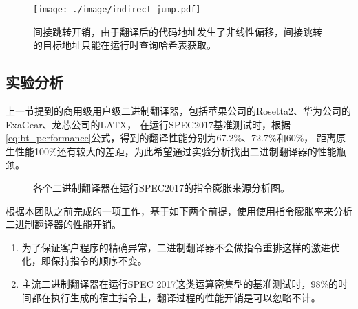 \begin{figure}[!htbp]
  \centering
  \texttt{[image: ./image/indirect\_jump.pdf]}
  \caption{间接跳转开销，由于翻译后的代码地址发生了非线性偏移，间接跳转的目标地址只能在运行时查询哈希表获取。}
  \label{img:indirect_jump}
\end{figure}

\subsection{实验分析}

上一节提到的商用级用户级二进制翻译器，包括苹果公司的Rosetta2、华为公司的ExaGear、龙芯公司的LATX，
在运行SPEC2017基准测试时，根据\ref{eq:bt_performance}公式，得到的翻译性能分别为67.2\%、72.7\%和60\%，
距离原生性能100\%还有较大的差距，为此希望通过实验分析找出二进制翻译器的性能瓶颈。


\begin{figure}[!htbp]
  \centering
  \caption{各个二进制翻译器在运行SPEC2017的指令膨胀来源分析图\cite{deflater}。}
  \label{img:insts_inflt_breakdown_2017}
\end{figure}

根据本团队之前完成的一项工作\cite{deflater}，基于如下两个前提，使用使用指令膨胀率来分析二进制翻译器的性能开销。
\begin{enumerate}
\item  为了保证客户程序的精确异常，二进制翻译器不会做指令重排这样的激进优化，即保持指令的顺序不变。
\item  主流二进制翻译器在运行SPEC 2017这类运算密集型的基准测试时，98\%的时间都在执行生成的宿主指令上，翻译过程的性能开销是可以忽略不计。
\end{enumerate}

